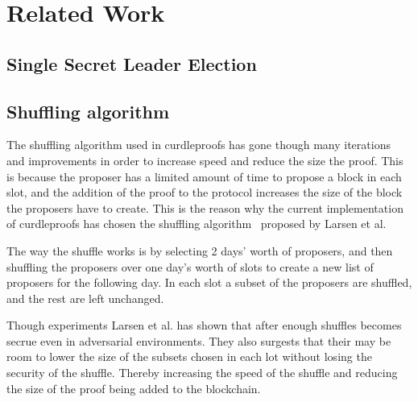 \section{Related Work}\label{sec:related-work}




\subsection{Single Secret Leader Election}\label{sec:related-work-SSLE}




\subsection{Shuffling algorithm}\label{sec:related-work-Shuffling-algorithm}
The shuffling algorithm used in curdleproofs has gone though many iterations and improvements in order to increase speed and reduce the size the proof.
This is because the proposer has a limited amount of time to propose a block in each slot, and the addition of the proof to the protocol increases the size of the block the proposers have to create.
This is the reason why the current implementation of curdleproofs has chosen the shuffling algorithm~\cite{cryptoeprint:2022/560} proposed by Larsen et al.

The way the shuffle works is by selecting 2 days' worth of proposers, and then shuffling the proposers over one day's worth of slots to create a new list of proposers for the following day.
In each slot a subset of the proposers are shuffled, and the rest are left unchanged.

Though experiments Larsen et al. has shown that after enough shuffles becomes secrue even in adversarial environments.
They also surgests that their may be room to lower the size of the subsets chosen in each lot without losing the security of the shuffle.
Thereby increasing the speed of the shuffle and reducing the size of the proof being added to the blockchain.

